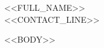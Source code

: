 \documentclass[11pt,<<PAPER>>]{article}
\newcommand{\resumeHeader}[2]{\begin{center}{\Huge #1}\\[5pt]{\small #2}\end{center}\vspace{-4pt}}
\begin{document}
\resumeHeader{<<FULL_NAME>>}{<<CONTACT_LINE>>}
<<BODY>>
\end{document}

